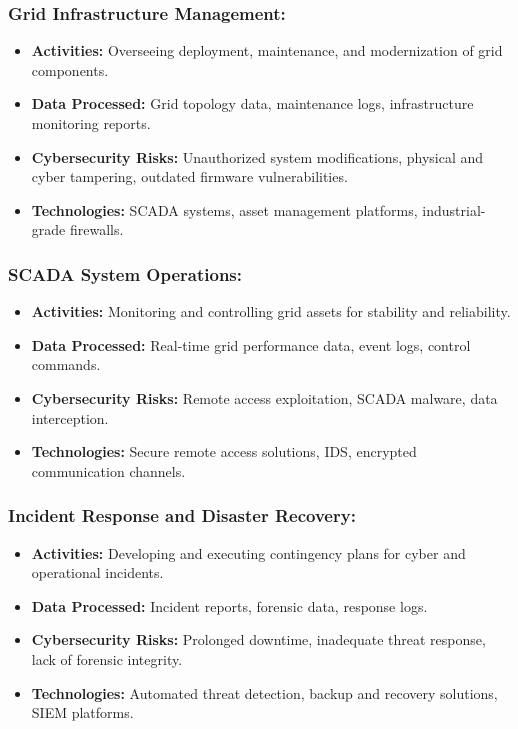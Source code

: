 \subsubsection{Grid Infrastructure Management:}
\begin{itemize}
    \item \textbf{Activities:} Overseeing deployment, maintenance, and modernization of grid components.
    \item \textbf{Data Processed:} Grid topology data, maintenance logs, infrastructure monitoring reports.
    \item \textbf{Cybersecurity Risks:} Unauthorized system modifications, physical and cyber tampering, outdated firmware vulnerabilities.
    \item \textbf{Technologies:} \ac{SCADA} systems, asset management platforms, industrial-grade firewalls.
\end{itemize}
\subsubsection{SCADA System Operations:}
\begin{itemize}
    \item \textbf{Activities:} Monitoring and controlling grid assets for stability and reliability.
    \item \textbf{Data Processed:} Real-time grid performance data, event logs, control commands.
    \item \textbf{Cybersecurity Risks:} Remote access exploitation, \ac{SCADA} malware, data interception.
    \item \textbf{Technologies:} Secure remote access solutions, \ac{IDS}, encrypted communication channels.
\end{itemize}

\subsubsection{Incident Response and Disaster Recovery:}

\begin{itemize}
    \item \textbf{Activities:} Developing and executing contingency plans for cyber and operational incidents.
    \item \textbf{Data Processed:} Incident reports, forensic data, response logs.
    \item \textbf{Cybersecurity Risks:} Prolonged downtime, inadequate threat response, lack of forensic integrity.
    \item \textbf{Technologies:} Automated threat detection, backup and recovery solutions, \ac{SIEM} platforms.
\end{itemize}

